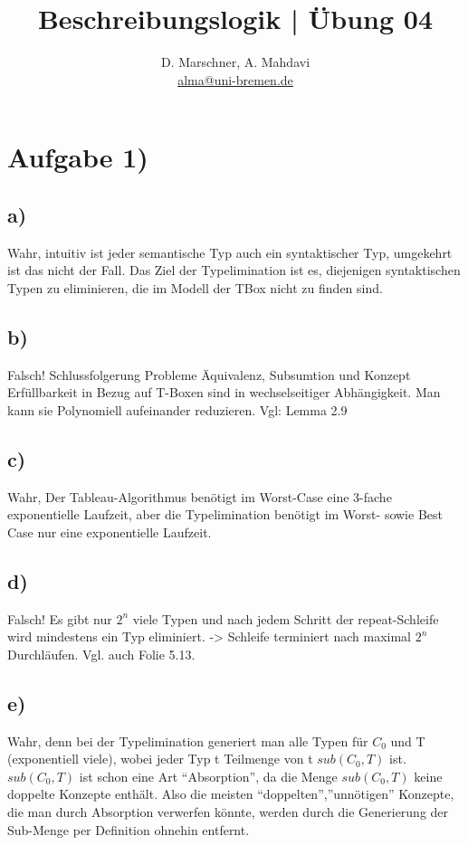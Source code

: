 \documentclass[12pt]{article}
\begin{document}
 
\title{Beschreibungslogik | Übung 04}
\author{D. Marschner, A. Mahdavi\\
\href{mailto:alma@uni-bremen.de}{alma@uni-bremen.de}}
\date{}
\maketitle
\section*{Aufgabe 1)}
\subsection*{a)}
Wahr, intuitiv ist jeder semantische Typ auch ein syntaktischer Typ, umgekehrt ist das nicht der Fall. Das Ziel der Typelimination ist es, diejenigen syntaktischen Typen zu eliminieren, die im Modell der TBox nicht zu finden sind.\\
\subsection*{b)}
Falsch! Schlussfolgerung Probleme Äquivalenz, Subsumtion und Konzept Erfüllbarkeit in Bezug auf T-Boxen sind in wechselseitiger Abhängigkeit. Man kann sie Polynomiell aufeinander reduzieren. 
Vgl: Lemma 2.9\\

\subsection*{c)}
Wahr, Der Tableau-Algorithmus benötigt im Worst-Case eine 3-fache exponentielle Laufzeit, aber die Typelimination benötigt  im Worst- sowie Best Case nur eine exponentielle Laufzeit.\\
\subsection*{d)}
Falsch! Es gibt nur $2^n$ viele Typen und nach jedem Schritt der repeat-Schleife wird mindestens ein Typ eliminiert. -> Schleife terminiert nach maximal $2^n$ Durchläufen. Vgl. auch Folie 5.13.\\
\subsection*{e)}
Wahr, denn bei der Typelimination generiert man alle Typen für $C_0$ und T (exponentiell viele), wobei jeder Typ t Teilmenge von t $sub(C_0, T )$ ist. $sub(C_0, T)$ ist schon eine Art “Absorption”, da die Menge $sub(C_0,T)$ keine doppelte Konzepte enthält. Also die meisten “doppelten”,”unnötigen” Konzepte, die man durch Absorption verwerfen könnte, werden durch die Generierung der Sub-Menge per Definition ohnehin entfernt.\\
\end{document}
